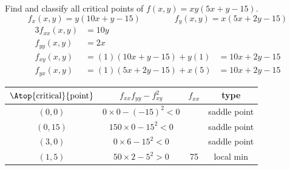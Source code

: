 \begin{eg}[$f(x,y) = xy(5x+y-15)$]\label{eg:MXMNlocalCc}
Find and classify all critical points of $f(x,y)=xy(5x+y-15)$.
\soln
\begin{equation*}
f_x(x,y)= y(10x+y-15)\qquad\qquad
f_y(x,y)= x(5x+2y-15)
\end{equation*}
\begin{alignat*}{3}
f_{xx}(x,y)&= 10y \\
f_{yy}(x,y)&= 2x \\
f_{xy}(x,y)&= (1)(10x+y-15)+y(1) &= 10x+2y-15
\\ f_{yx}(x,y)&= (1)(5x+2y-15)+x(5) &= 10x+2y-15
\end{alignat*}
\begin{center}
\renewcommand{\arraystretch}{1.3}
\begin{tabular}{|c|c|c|c|}
\hline
$\Atop{\text{critical}}{\text{point}}$  & $f_{xx}f_{yy}-f_{xy}^2$ &
$f_{xx}$ & type \\
\hline
$(0,0)$  & $0\times0-(-15)^2<0$ & & saddle point \\ \hline
$(0,15)$ & $150\times0-15^2<0$ & & saddle point \\ \hline
$(3,0)$  & $0\times 6-15^2<0$  & & saddle point \\ \hline
$(1,5)$  & $50\times 2-5^2>0$ & 75 & local min \\ \hline
\end{tabular}
\renewcommand{\arraystretch}{1.0}
\end{center}
\end{eg}
